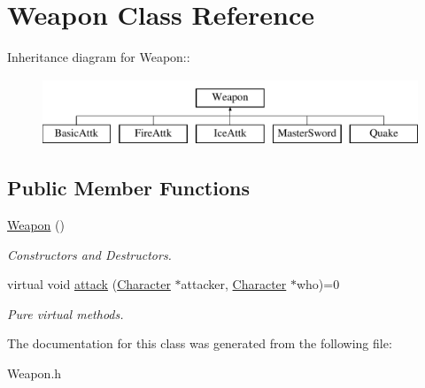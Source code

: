 \hypertarget{classWeapon}{
\section{Weapon Class Reference}
\label{classWeapon}
}
Inheritance diagram for Weapon::\begin{figure}[H]
\begin{center}
\leavevmode
\includegraphics[height=2cm]{classWeapon}
\end{center}
\end{figure}
\subsection*{Public Member Functions}
\begin{DoxyCompactItemize}
\item 
\hypertarget{classWeapon_a42dbc46dd70319a24763992c4ebbd396}{
\hyperlink{classWeapon_a42dbc46dd70319a24763992c4ebbd396}{Weapon} ()}
\label{classWeapon_a42dbc46dd70319a24763992c4ebbd396}

\begin{DoxyCompactList}\small\item\em Constructors and Destructors. \item\end{DoxyCompactList}\item 
\hypertarget{classWeapon_a74d99dd40d8872718710bcf94fff98d7}{
virtual void \hyperlink{classWeapon_a74d99dd40d8872718710bcf94fff98d7}{attack} (\hyperlink{classCharacter}{Character} $\ast$attacker, \hyperlink{classCharacter}{Character} $\ast$who)=0}
\label{classWeapon_a74d99dd40d8872718710bcf94fff98d7}

\begin{DoxyCompactList}\small\item\em Pure virtual methods. \item\end{DoxyCompactList}\end{DoxyCompactItemize}


The documentation for this class was generated from the following file:\begin{DoxyCompactItemize}
\item 
Weapon.h\end{DoxyCompactItemize}
